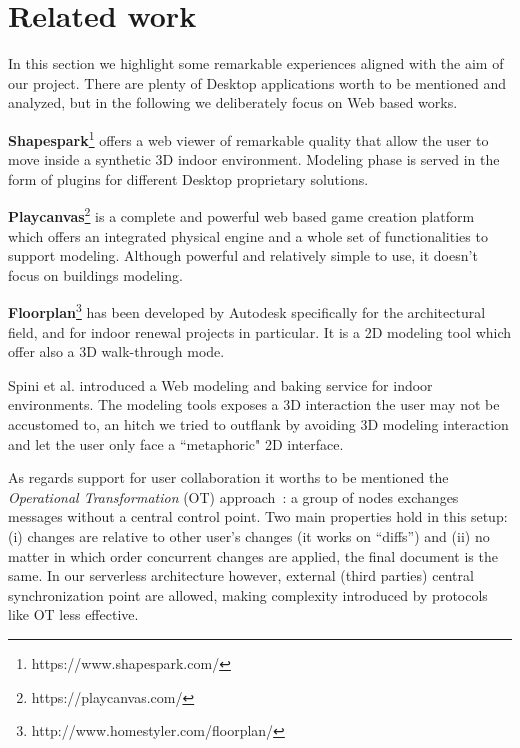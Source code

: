 \section{Related work}\label{sec:related_work}

In this section we highlight some remarkable experiences aligned with the aim of our project. There are plenty of Desktop applications worth to be mentioned and analyzed, but in the following we deliberately focus on Web based works. 

\textbf{Shapespark}\footnote{https://www.shapespark.com/} offers a web viewer of remarkable quality that allow the user to move inside a synthetic 3D indoor environment. Modeling phase is served in the form of plugins for different Desktop proprietary solutions.

\textbf{Playcanvas}\footnote{https://playcanvas.com/} is a complete and powerful web based game creation platform which offers an integrated physical engine and a whole set of functionalities to support modeling. Although powerful and relatively simple to use, it doesn't focus on buildings modeling.

\textbf{Floorplan}\footnote{http://www.homestyler.com/floorplan/} has been developed by Autodesk specifically for the architectural field, and for indoor renewal projects in particular. It is a 2D modeling tool which offer also a 3D walk-through mode.

Spini et al. \cite{Spini:2016:WIA:2945292.2945309} introduced a Web modeling and baking service for indoor environments. The modeling tools exposes a 3D interaction the user may not be accustomed to, an hitch we tried to outflank by avoiding 3D modeling interaction and let the user only face a ``metaphoric" 2D interface.

As regards support for user collaboration it worths to be mentioned the \emph{Operational Transformation} (OT) approach~\cite{Ellis:1989:CCG:66926.66963}: a group of nodes exchanges messages without a central control point. Two main properties hold in this setup: (i) changes are relative to other user's changes (it works on ``diffs'') and (ii) no matter in which order concurrent changes are applied, the final document is the same. In our serverless architecture however, external (third parties) central synchronization point are allowed, making complexity introduced by protocols like OT less effective.